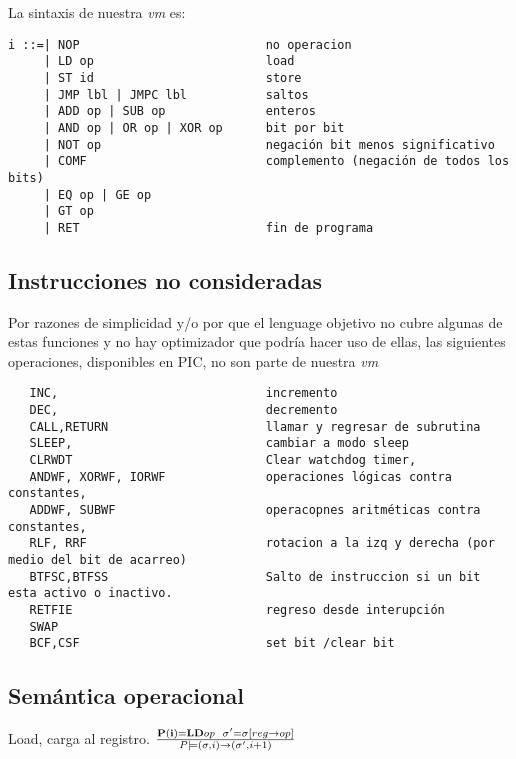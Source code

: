 \documentclass[12pt]{report}
\begin{document}
La sintaxis de nuestra \textit{vm} es:


\begin{verbatim}
i ::=| NOP                          no operacion
     | LD op                        load
     | ST id                        store
     | JMP lbl | JMPC lbl           saltos
     | ADD op | SUB op              enteros
     | AND op | OR op | XOR op      bit por bit
     | NOT op                       negación bit menos significativo
     | COMF                         complemento (negación de todos los bits)
     | EQ op | GE op
     | GT op                 
     | RET                          fin de programa

\end{verbatim}
 

\subsection{Instrucciones no consideradas}




Por razones de simplicidad y/o por que el lenguage objetivo no cubre algunas de estas funciones y no hay optimizador que podría hacer uso de ellas, las siguientes operaciones, disponibles en PIC, no son parte de nuestra \textit{vm}

\begin{verbatim}
   INC,                             incremento
   DEC,                             decremento
   CALL,RETURN                      llamar y regresar de subrutina                  
   SLEEP,                           cambiar a modo sleep
   CLRWDT                           Clear watchdog timer, 
   ANDWF, XORWF, IORWF              operaciones lógicas contra constantes,
   ADDWF, SUBWF                     operacopnes aritméticas contra constantes,
   RLF, RRF                         rotacion a la izq y derecha (por medio del bit de acarreo)
   BTFSC,BTFSS                      Salto de instruccion si un bit esta activo o inactivo.
   RETFIE                           regreso desde interupción
   SWAP   
   BCF,CSF                          set bit /clear bit 
\end{verbatim}


\subsection{Semántica operacional}




Load, carga al registro.  $\frac{ {\bf P(i)=LD}  op \>\>\> \sigma'=\sigma[reg \rightarrow op]}{P \models (\sigma,i) \rightarrow (\sigma',i+1)}$ 
\end{document}
